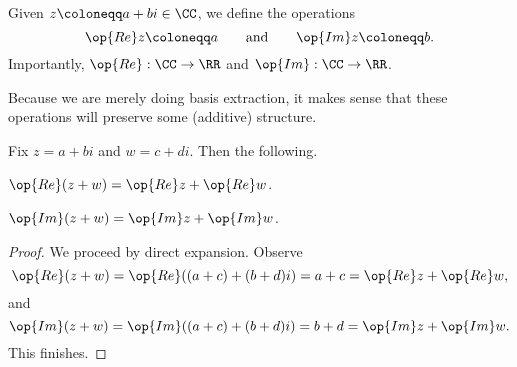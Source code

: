 \documentclass[../notes.tex]{subfiles}
\begin{document}
\begin{definition}
	Given $z\coloneqq a+bi\in\CC$, we define the operations
	\[\op{Re}z\coloneqq a\qquad\text{and}\qquad\op{Im}z\coloneqq b.\]
	Importantly, $\op{Re}:\CC\to\RR$ and $\op{Im}:\CC\to\RR$.
\end{definition}
Because we are merely doing basis extraction, it makes sense that these operations will preserve some (additive) structure.
\begin{proposition}
	Fix $z=a+bi$ and $w=c+di$. Then the following.
	\begin{listalph}
		\item $\op{Re}(z+w)=\op{Re}z+\op{Re}w$.
		\item $\op{Im}(z+w)=\op{Im}z+\op{Im}w$.
	\end{listalph}
\end{proposition}
\begin{proof}
	We proceed by direct expansion. Observe
	\[\op{Re}(z+w)=\op{Re}((a+c)+(b+d)i)=a+c=\op{Re}z+\op{Re}w,\]
	and
	\[\op{Im}(z+w)=\op{Im}((a+c)+(b+d)i)=b+d=\op{Im}z+\op{Im}w.\]
	This finishes.
\end{proof}
\end{document}
